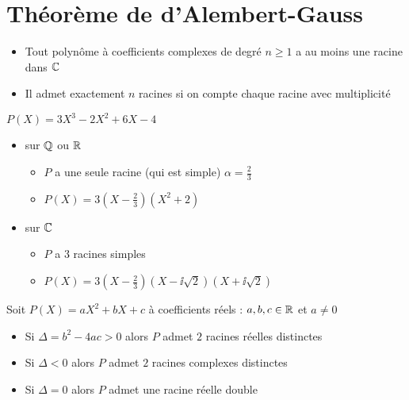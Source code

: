 \section{Théorème de d'Alembert-Gauss}

\begin{frame}

\begin{theoreme}  
\begin{itemize}
  \item Tout polynôme à coefficients complexes de degré $n \ge 1$  
a au moins une racine dans $\mathbb{C}$
\pause
  \item Il admet exactement $n$ racines si on compte chaque racine
avec multiplicité
\end{itemize}
\end{theoreme}

\pause

\begin{exemple}
$P(X)=3X^3-2X^2+6X-4$
\pause
\begin{itemize}
  \item sur $\mathbb{Q}$ ou $\mathbb{R}$ 
  \begin{itemize}
    \item $P$ a une seule racine (qui est simple) $\alpha = \frac23$
\pause
    \item $P(X)=3(X-\frac23)(X^2+2)$
    \end{itemize}
\pause
  \item sur $\mathbb{C}$
  \begin{itemize} 
    \item $P$ a $3$ racines simples
\pause 
    \item $P(X)=3(X-\frac23)(X-\ii\sqrt2)(X+\ii\sqrt2)$
  \end{itemize}
\end{itemize}

\end{exemple}

\end{frame}


\begin{frame}
\begin{exemple}
Soit $P(X)=aX^2+bX+c$ à coefficients réels : $a,b,c \in \mathbb{R}$ et $a\neq 0$
\pause
\begin{itemize}
  \item Si $\Delta = b^2-4ac > 0$ alors $P$ admet $2$ racines réelles distinctes 
\pause
  \item Si $\Delta < 0$ alors $P$ admet $2$ racines complexes distinctes 
\pause
  \item Si $\Delta = 0$ alors $P$ admet une racine réelle double 
\end{itemize}
\end{exemple}
\end{frame}


